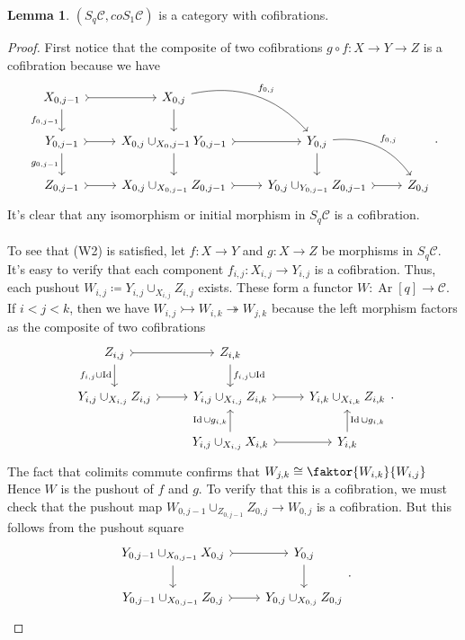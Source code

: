 \documentclass[10pt,letterpaper,cm]{nupset}
\theoremstyle{definition}
\theoremstyle{theorem}
\newtheorem{lemma}[definition]{Lemma}
\theoremstyle{remark}
\newcommand{\1}{\mathbf{1}}
\renewcommand{\c}{\mathscr{C}}
\newcommand{\0}{\vec 0}
\DeclareMathOperator{\id}{Id}
\DeclareMathOperator{\Ar}{Ar}
\begin{document}
\begin{lemma}
$(S_q\c, coS_1 \c)$ is a category with cofibrations. 
\end{lemma}
\begin{proof}
First notice that the composite of two cofibrations $g \circ f : X \to Y \to Z$ is a cofibration because we have
\[
\begin{tikzcd}
{X_{0, j-1}} \arrow[r, tail] \arrow[d, "{f_{0, j-1}}"'] & {X_{0, j}} \arrow[d] \arrow[rd, "{f_{0, j}}", bend left] &  &  \\
{Y_{0, j-1}} \arrow[d, "{g_{0, j-1}}"'] \arrow[r, tail] & {X_{0, j} \cup_{X_0, j-1} Y_{0, j-1}} \arrow[d] \arrow[r, tail] & {Y_{0, j}} \arrow[d] \arrow[rd, "{f_{0, j}}", bend left] &  \\
{Z_{0, j-1}} \arrow[r, tail] & {X_{0, j} \cup_{X_{0, j-1}} Z_{0, j-1}} \arrow[r, tail] & {Y_{0, j} \cup_{Y_{0, j-1}} Z_{0, j-1}} \arrow[r, tail] & {Z_{0, j}}
\end{tikzcd}.
\]
It's clear that any isomorphism or initial morphism in $S_q \c$ is a cofibration.
\\ \\
To see that (W2) is satisfied, let $f: X \to Y$ and $g : X \to Z$ be morphisms in $S_q \c$. It's easy to verify that each component $f_{i, j}: X_{i, j} \to Y_{i, j}$ is a cofibration. Thus, each pushout $W_{i, j} \coloneqq Y_{i,j} \cup_{X_{i,j}} Z_{i, j}$ exists.
These form a functor $W: \Ar[q] \to \c$. If $i < j < k$, then we have $W_{i,j} \rightarrowtail W_{i, k} \twoheadrightarrow W_{j,k}$ because the left morphism factors as the composite of two cofibrations
\[
\begin{tikzcd}
{Z_{i,j}} \arrow[d, "{f_{i,j} \cup \id}"'] \arrow[r, tail] & {Z_{i,k}} \arrow[d, "{f_{i,j} \cup \id}"] &  \\
{Y_{i,j} \cup_{X_{i,j}} Z_{i,j}} \arrow[r, tail] & {Y_{i,j} \cup_{X_{i,j}} Z_{i,k}} \arrow[r, tail] & {Y_{i,k} \cup_{X_{i,k}} Z_{i,k}} \\
 & {Y_{i,j} \cup_{X_{i,j}} X_{i,k}} \arrow[u, "{\id \cup g_{i,k}}"] \arrow[r, tail] & {Y_{i,k}} \arrow[u, "{\id \cup g_{i,k}}"']
\end{tikzcd}
.\] The fact that colimits commute confirms that $W_{j,k} \cong \faktor{W_{i,k}}{W_{i,j}}$ Hence $W$ is the pushout of $f$ and $g$. To verify that this is a cofibration, we must check that the pushout map $W_{0, j-1} \cup_{Z_{0, j-1}} Z_{0, j} \to W_{0, j}$ is a cofibration. But this follows from the pushout square
\[
\begin{tikzcd}
{Y_{0, j-1}\cup_{X_{0, j-1}} X_{0, j}} \arrow[d] \arrow[r, tail] & {Y_{0, j}} \arrow[d] \\
{Y_{0, j-1}\cup_{X_{0, j-1}} Z_{0, j}} \arrow[r, tail] & {Y_{0, j}\cup_{X_{0, j}} Z_{0, j}}
\end{tikzcd}
.\]
\end{proof}
\end{document}
